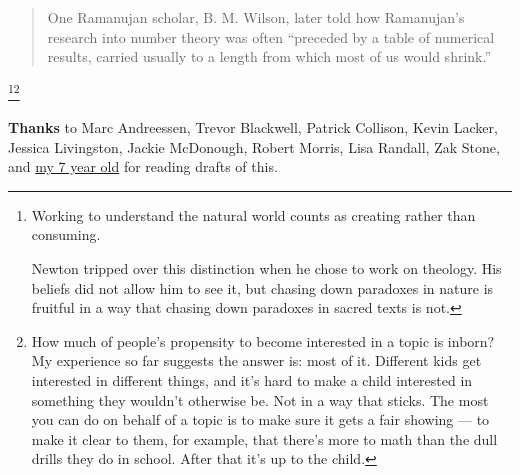 {\begin{quote}
One Ramanujan scholar, B. M. Wilson, later told how Ramanujan's research
into number theory was often ``preceded by a table of numerical results,
carried usually to a length from which most of us would shrink.''
\end{quote}}\footnote{Working to understand the natural world counts as creating
rather than consuming.

Newton tripped over this distinction when he chose to work on theology.
His beliefs did not allow him to see it, but chasing down paradoxes in
nature is fruitful in a way that chasing down paradoxes in sacred texts
is not.}\footnote{How much of people's propensity to become interested in a topic
is inborn? My experience so far suggests the answer is: most of it.
Different kids get interested in different things, and it's hard to make
a child interested in something they wouldn't otherwise be. Not in a way
that sticks. The most you can do on behalf of a topic is to make sure it
gets a fair showing --- to make it clear to them, for example, that
there's more to math than the dull drills they do in school. After that
it's up to the child.}

\textbf{Thanks} to Marc Andreessen, Trevor Blackwell, Patrick Collison,
Kevin Lacker, Jessica Livingston, Jackie McDonough, Robert Morris, Lisa
Randall, Zak Stone, and
\href{https://twitter.com/paulg/status/1196537802621669376}{my 7 year
old} for reading drafts of this.
